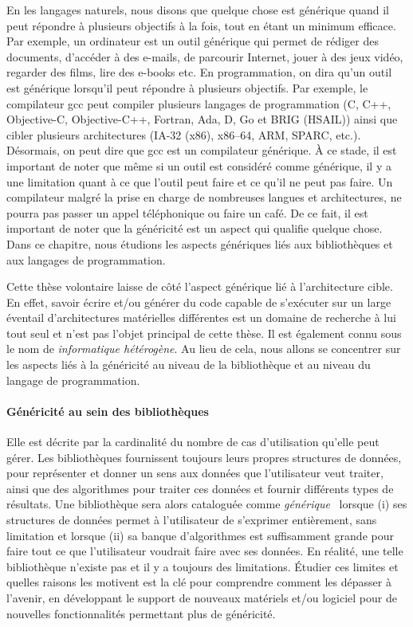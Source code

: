 En les langages naturels, nous disons que quelque chose est générique quand il peut répondre à plusieurs objectifs à la
fois, tout en étant un minimum efficace. Par exemple, un ordinateur est un outil générique qui permet de rédiger des
documents, d'accéder à des e-mails, de parcourir Internet, jouer à des jeux vidéo, regarder des films, lire des e-books
etc. En programmation, on dira qu'un outil est générique lorsqu'il peut répondre à plusieurs objectifs. Par exemple, le
compilateur gcc peut compiler plusieurs langages de programmation (C, C++, Objective-C, Objective-C++, Fortran, Ada, D,
Go et BRIG (HSAIL)) ainsi que cibler plusieurs architectures (IA-32 (x86), x86--64, ARM, SPARC, etc.). Désormais, on
peut dire que gcc est un compilateur générique. À ce stade, il est important de noter que même si un outil est considéré
comme générique, il y a une limitation quant à ce que l'outil peut faire et ce qu'il ne peut pas faire. Un compilateur
malgré la prise en charge de nombreuses langues et architectures, ne pourra pas passer un appel téléphonique ou faire un
café. De ce fait, il est important de noter que la généricité est un aspect qui qualifie quelque chose. Dans ce
chapitre, nous étudions les aspects génériques liés aux bibliothèques et aux langages de programmation.

Cette thèse volontaire laisse de côté l'aspect générique lié à l'architecture cible. En effet, savoir écrire et/ou
générer du code capable de s'exécuter sur un large éventail d'architectures matérielles différentes est un domaine de
recherche à lui tout seul et n'est pas l'objet principal de cette thèse. Il est également connu sous le nom de
\emph{informatique hétérogène}. Au lieu de cela, nous allons se concentrer sur les aspects liés à la généricité au
niveau de la bibliothèque et au niveau du langage de programmation.

\paragraph{Généricité au sein des bibliothèques} Elle est décrite par la cardinalité du nombre de cas d'utilisation
qu'elle peut gérer. Les bibliothèques fournissent toujours leurs propres structures de données, pour représenter et
donner un sens aux données que l'utilisateur veut traiter, ainsi que des algorithmes pour traiter ces données et fournir
différents types de résultats. Une bibliothèque sera alors cataloguée comme
\emph{générique}~\parencite{musser.1994.algorithm} lorsque (i) ses structures de données permet à l'utilisateur de
s'exprimer entièrement, sans limitation et lorsque (ii) sa banque d'algorithmes est suffisamment grande pour faire tout
ce que l'utilisateur voudrait faire avec ses données. En réalité, une telle bibliothèque n'existe pas et il y a toujours
des limitations. Étudier ces limites et quelles raisons les motivent est la clé pour comprendre comment les dépasser à
l'avenir, en développant le support de nouveaux matériels et/ou logiciel pour de nouvelles fonctionnalités permettant
plus de généricité.

